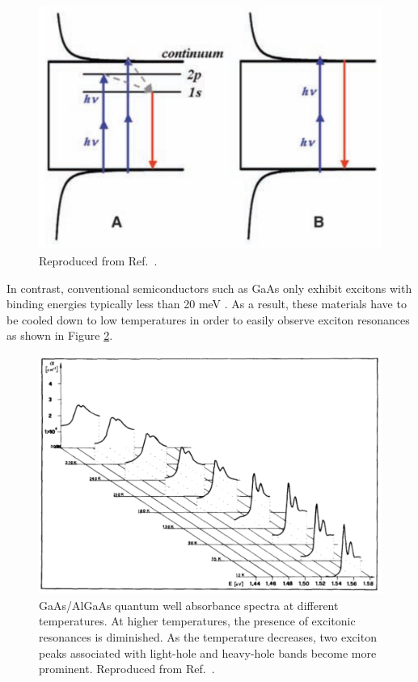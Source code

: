 \begin{figure}[H]
	\centering
	\includegraphics[scale=0.3]{images/chapter_optical_props/cnt_two_photon}
	\caption{Reproduced from Ref.\ \cite{wang2005optical}. }
	\label{fig:cnt_two_photon}
\end{figure}

In contrast, conventional semiconductors such as GaAs only exhibit excitons with binding energies typically less than 20 meV \cite{liang1970excitons}.  As a result, these materials have to be cooled down to low temperatures in order to easily observe exciton resonances as shown in Figure \ref{fig:gaas_vs_cnt_absorbance}.

\begin{figure}[h]
	\centering
	\includegraphics[scale=0.55]{images/chapter_optical_props/gaas_absorbance_filipowicz}
	\caption{GaAs/AlGaAs quantum well absorbance spectra at different temperatures. At higher temperatures, the presence of excitonic resonances is diminished. As the temperature decreases, two exciton peaks associated with light-hole and heavy-hole bands become more prominent. Reproduced from Ref.\ \cite{filipowicz1990temperature}.}
	\label{fig:gaas_vs_cnt_absorbance}
\end{figure}

